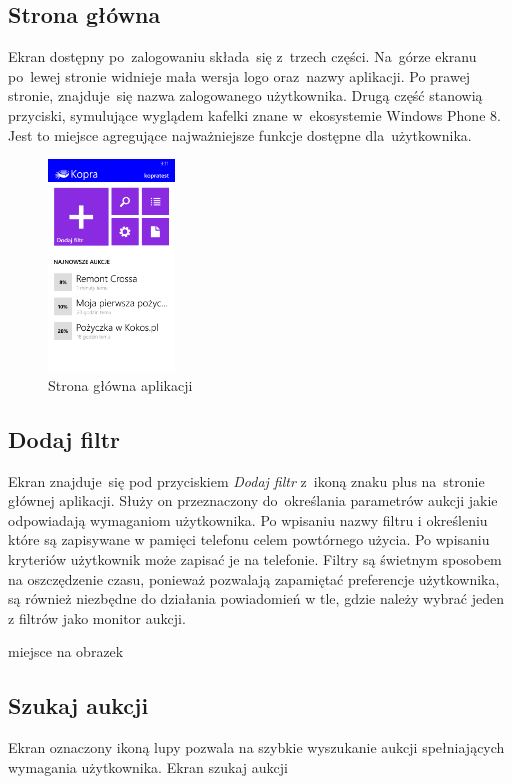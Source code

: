 \documentclass[a4paper,twoside,titlepage,openright]{book}
\begin{document}
\subsection{Strona główna}
Ekran dostępny po~zalogowaniu składa~się z~trzech części. Na~górze ekranu po~lewej stronie widnieje mała wersja logo oraz~nazwy aplikacji. Po prawej stronie, znajduje~się nazwa zalogowanego użytkownika. Drugą część stanowią przyciski, symulujące wyglądem kafelki znane w~ekosystemie Windows Phone 8. Jest to miejsce agregujące najważniejsze funkcje dostępne dla~użytkownika. 
\begin{figure}[h]
	\begin{minipage}[h]{\textwidth}
		\centering
		\includegraphics[width=0.3\textwidth]{mainScreen.png}
		\caption{Strona główna aplikacji}
	\end{minipage}
	\hfill
\end{figure}

\subsection{Dodaj filtr}
Ekran znajduje~się pod przyciskiem \textit{Dodaj filtr} z~ikoną znaku plus na~stronie głównej aplikacji. Służy on przeznaczony do~określania parametrów aukcji jakie odpowiadają wymaganiom użytkownika. Po wpisaniu nazwy filtru i określeniu  które są zapisywane w pamięci telefonu celem powtórnego użycia. Po wpisaniu kryteriów użytkownik może zapisać je na telefonie. Filtry są świetnym sposobem na oszczędzenie czasu, ponieważ pozwalają zapamiętać preferencje użytkownika, są również niezbędne do działania powiadomień w tle, gdzie należy wybrać jeden z filtrów jako monitor aukcji.

{\color{red}miejsce na obrazek}

\subsection{Szukaj aukcji}
Ekran oznaczony ikoną lupy pozwala na szybkie wyszukanie aukcji spełniających wymagania użytkownika.
{\color{red}Ekran szukaj aukcji}
\end{document}
